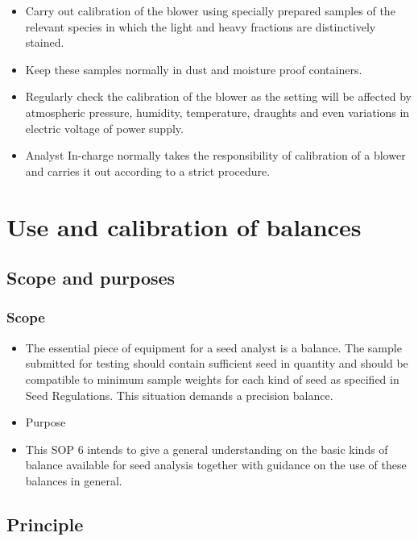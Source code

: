 \documentclass[]{book}
\providecommand{\tightlist}{%
  \setlength{\itemsep}{0pt}\setlength{\parskip}{0pt}}
\begin{document}
\begin{itemize}
\tightlist
\item
  Carry out calibration of the blower using specially prepared samples
  of the relevant species in which the light and heavy fractions are
  distinctively stained.
\item
  Keep these samples normally in dust and moisture proof containers.
\item
  Regularly check the calibration of the blower as the setting will be
  affected by atmospheric pressure, humidity, temperature, draughts and
  even variations in electric voltage of power supply.
\item
  Analyst In-charge normally takes the responsibility of calibration of
  a blower and carries it out according to a strict procedure.
\end{itemize}

\chapter{Use and calibration of
balances}\label{use-and-calibration-of-balances}

\section{Scope and purposes}\label{scope-and-purposes-1}

\subsection{Scope}\label{scope-2}

\begin{itemize}
\tightlist
\item
  The essential piece of equipment for a seed analyst is a balance. The
  sample submitted for testing should contain sufficient seed in
  quantity and should be compatible to minimum sample weights for each
  kind of seed as specified in Seed Regulations. This situation demands
  a precision balance.
\item
  Purpose
\item
  This SOP 6 intends to give a general understanding on the basic kinds
  of balance available for seed analysis together with guidance on the
  use of these balances in general.
\end{itemize}

\section{Principle}\label{principle-1}
\end{document}
